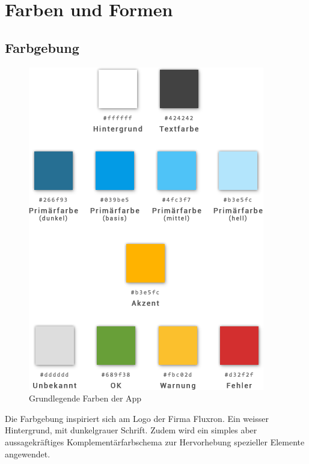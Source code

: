 
\section{Farben und Formen}
\label{sec:Farben und Formen}

\subsection{Farbgebung}
\label{subsec:Farbgebung}
\begin{figure}[H]
    \begin{center}
        \includegraphics[trim=0 130 0 0,clip,scale=0.5]{uiux/res/basic_colors}
    \end{center}
    \caption{Grundlegende Farben der App}
\end{figure}
Die Farbgebung inspiriert sich am Logo der Firma Fluxron. Ein weisser Hintergrund, mit dunkelgrauer Schrift. Zudem wird ein simples aber aussagekräftiges Komplementärfarbschema zur Hervorhebung spezieller Elemente angewendet.

